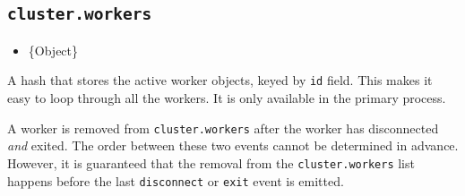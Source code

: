 \begin{Shaded}
\begin{Highlighting}[]
\OperatorTok{=} \NormalTok{(}\NormalTok{)}\OperatorTok{;}

\NormalTok{) \{}
  \NormalTok{(}\NormalTok{)}\OperatorTok{;}
\NormalTok{()}\OperatorTok{;}
\NormalTok{()}\OperatorTok{;}
\NormalTok{\} } \NormalTok{) \{}
  \NormalTok{(}\SpecialCharTok{$\{}\SpecialCharTok{\}}\VerbatimStringTok{\textasciigrave{}}\NormalTok{)}\OperatorTok{;}
\NormalTok{\}}
\end{Highlighting}
\end{Shaded}

\subsection{\texorpdfstring{\texttt{cluster.workers}}{cluster.workers}}\label{cluster.workers}

\begin{itemize}
\tightlist
\item
  \{Object\}
\end{itemize}

A hash that stores the active worker objects, keyed by \texttt{id}
field. This makes it easy to loop through all the workers. It is only
available in the primary process.

A worker is removed from \texttt{cluster.workers} after the worker has
disconnected \emph{and} exited. The order between these two events
cannot be determined in advance. However, it is guaranteed that the
removal from the \texttt{cluster.workers} list happens before the last
\texttt{\textquotesingle{}disconnect\textquotesingle{}} or
\texttt{\textquotesingle{}exit\textquotesingle{}} event is emitted.

\begin{Shaded}
\begin{Highlighting}[]
 \OperatorTok{;}

\NormalTok{ (} \NormalTok{)) \{}
\NormalTok{(}\NormalTok{)}\OperatorTok{;}
\NormalTok{\}}
\end{Highlighting}
\end{Shaded}

